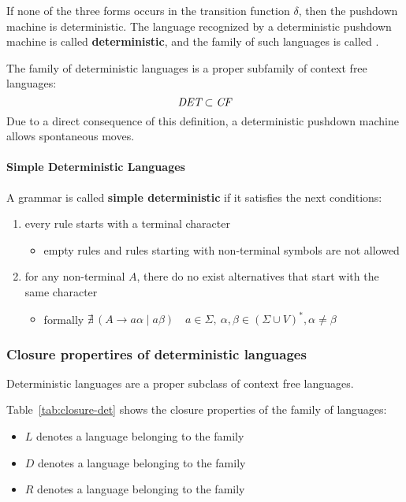 \documentclass[english]{article}
\begin{document}
If none of the three forms occurs in the transition function \(\delta\), then the pushdown machine is deterministic.
The language recognized by a deterministic pushdown machine is called \textbf{deterministic}, and the family of such languages is called \DET.

The family of deterministic languages is a proper subfamily of context free languages:
\[ \textit{DET} \subset \textit{CF} \]
Due to a direct consequence of this definition, a deterministic pushdown machine allows spontaneous moves.

\paragraph{Simple Deterministic Languages}

A grammar is called \textbf{simple deterministic} if it satisfies the next conditions:

\begin{enumerate}
  \item every rule \RP starts with a terminal character
        \begin{itemize}
          \item empty rules and rules starting with non-terminal symbols are not allowed
        \end{itemize}
  \item for any non-terminal \(A\), there do no exist alternatives that start with the same character
        \begin{itemize}
          \item formally \(\nexists \, \left( A \rightarrow a \alpha \mid a \beta \right) \quad a \in \Sigma, \ \alpha, \beta \in \left( \Sigma \cup V \right)^\ast, \alpha \neq \beta\)
        \end{itemize}
\end{enumerate}

\subsubsection{Closure propertires of deterministic \CF languages}

Deterministic languages are a proper subclass of context free languages.

Table~\ref{tab:closure-det} shows the closure properties of the \DET family of languages:

\begin{itemize}
  \item \(L\) denotes a language belonging to the \CF family
  \item \(D\) denotes a language belonging to the \DET family
  \item \(R\) denotes a language belonging to the \REG family
\end{itemize}
\end{document}
